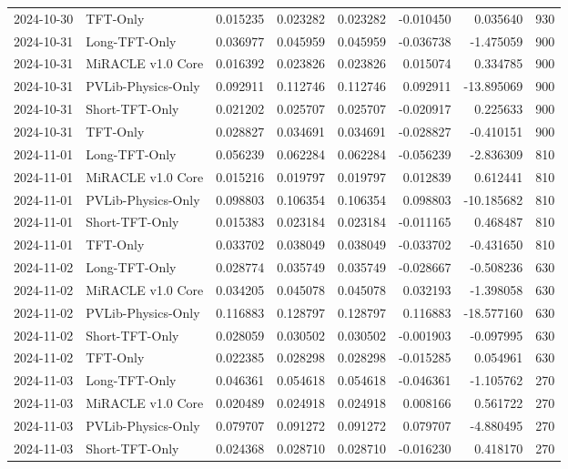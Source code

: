 \begin{tabular}{llrrrrrr}
2024-10-30 & TFT-Only & 0.015235 & 0.023282 & 0.023282 & -0.010450 & 0.035640 & 930 \\
2024-10-31 & Long-TFT-Only & 0.036977 & 0.045959 & 0.045959 & -0.036738 & -1.475059 & 900 \\
2024-10-31 & MiRACLE v1.0 Core & 0.016392 & 0.023826 & 0.023826 & 0.015074 & 0.334785 & 900 \\
2024-10-31 & PVLib-Physics-Only & 0.092911 & 0.112746 & 0.112746 & 0.092911 & -13.895069 & 900 \\
2024-10-31 & Short-TFT-Only & 0.021202 & 0.025707 & 0.025707 & -0.020917 & 0.225633 & 900 \\
2024-10-31 & TFT-Only & 0.028827 & 0.034691 & 0.034691 & -0.028827 & -0.410151 & 900 \\
2024-11-01 & Long-TFT-Only & 0.056239 & 0.062284 & 0.062284 & -0.056239 & -2.836309 & 810 \\
2024-11-01 & MiRACLE v1.0 Core & 0.015216 & 0.019797 & 0.019797 & 0.012839 & 0.612441 & 810 \\
2024-11-01 & PVLib-Physics-Only & 0.098803 & 0.106354 & 0.106354 & 0.098803 & -10.185682 & 810 \\
2024-11-01 & Short-TFT-Only & 0.015383 & 0.023184 & 0.023184 & -0.011165 & 0.468487 & 810 \\
2024-11-01 & TFT-Only & 0.033702 & 0.038049 & 0.038049 & -0.033702 & -0.431650 & 810 \\
2024-11-02 & Long-TFT-Only & 0.028774 & 0.035749 & 0.035749 & -0.028667 & -0.508236 & 630 \\
2024-11-02 & MiRACLE v1.0 Core & 0.034205 & 0.045078 & 0.045078 & 0.032193 & -1.398058 & 630 \\
2024-11-02 & PVLib-Physics-Only & 0.116883 & 0.128797 & 0.128797 & 0.116883 & -18.577160 & 630 \\
2024-11-02 & Short-TFT-Only & 0.028059 & 0.030502 & 0.030502 & -0.001903 & -0.097995 & 630 \\
2024-11-02 & TFT-Only & 0.022385 & 0.028298 & 0.028298 & -0.015285 & 0.054961 & 630 \\
2024-11-03 & Long-TFT-Only & 0.046361 & 0.054618 & 0.054618 & -0.046361 & -1.105762 & 270 \\
2024-11-03 & MiRACLE v1.0 Core & 0.020489 & 0.024918 & 0.024918 & 0.008166 & 0.561722 & 270 \\
2024-11-03 & PVLib-Physics-Only & 0.079707 & 0.091272 & 0.091272 & 0.079707 & -4.880495 & 270 \\
2024-11-03 & Short-TFT-Only & 0.024368 & 0.028710 & 0.028710 & -0.016230 & 0.418170 & 270 \\

\end{tabular}
